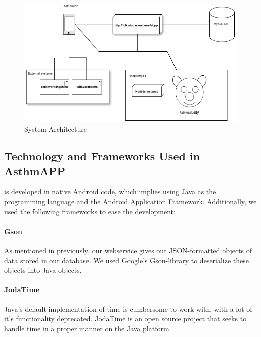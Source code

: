 \begin{figure}
		\centering
			\includegraphics[width=0.60\paperwidth]{Pictures/system-architecture.png}
		\caption{System Architecture}
		\label{fig:basic-architecture}
\end{figure}

\subsection{Technology and Frameworks Used in AsthmAPP}
\label{sec:techandframeinapp}
\app{} is developed in native Android code, which implies using Java as the programming language and the Android Application Framework. Additionally, we used the following frameworks to ease the development: 

\paragraph{Gson} As mentioned in previously, our webservice gives out JSON-formatted objects of data stored in our database. We used Google's Gson-library to deserialize these objects into Java objects.

\paragraph{JodaTime} Java's default implementation of time is cumbersome to work with, with a lot of it's functionality deprecated. JodaTime is an open source project that seeks to handle time in a proper manner on the Java platform.     


